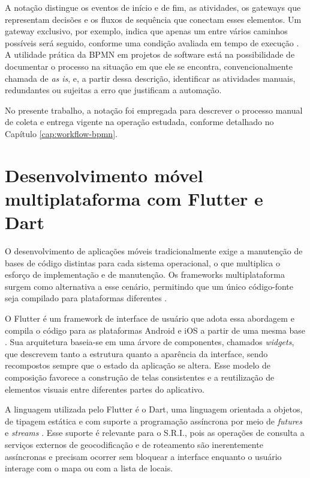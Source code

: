 A notação distingue os eventos de início e de fim, as atividades, os gateways que representam decisões e os fluxos de sequência que conectam esses elementos. Um gateway exclusivo, por exemplo, indica que apenas um entre vários caminhos possíveis será seguido, conforme uma condição avaliada em tempo de execução \cite{omg2011bpmn}. A utilidade prática da BPMN em projetos de software está na possibilidade de documentar o processo na situação em que ele se encontra, convencionalmente chamada de \textit{as is}, e, a partir dessa descrição, identificar as atividades manuais, redundantes ou sujeitas a erro que justificam a automação.

No presente trabalho, a notação foi empregada para descrever o processo manual de coleta e entrega vigente na operação estudada, conforme detalhado no Capítulo \ref{cap:workflow-bpmn}.

\section{Desenvolvimento móvel multiplataforma com Flutter e Dart}

O desenvolvimento de aplicações móveis tradicionalmente exige a manutenção de bases de código distintas para cada sistema operacional, o que multiplica o esforço de implementação e de manutenção. Os frameworks multiplataforma surgem como alternativa a esse cenário, permitindo que um único código-fonte seja compilado para plataformas diferentes \cite{sommerville2019}.

O Flutter é um framework de interface de usuário que adota essa abordagem e compila o código para as plataformas Android e iOS a partir de uma mesma base \cite{flutter2024}. Sua arquitetura baseia-se em uma árvore de componentes, chamados \textit{widgets}, que descrevem tanto a estrutura quanto a aparência da interface, sendo recompostos sempre que o estado da aplicação se altera. Esse modelo de composição favorece a construção de telas consistentes e a reutilização de elementos visuais entre diferentes partes do aplicativo.

A linguagem utilizada pelo Flutter é o Dart, uma linguagem orientada a objetos, de tipagem estática e com suporte a programação assíncrona por meio de \textit{futures} e \textit{streams} \cite{dart2024}. Esse suporte é relevante para o S.R.I., pois as operações de consulta a serviços externos de geocodificação e de roteamento são inerentemente assíncronas e precisam ocorrer sem bloquear a interface enquanto o usuário interage com o mapa ou com a lista de locais.

